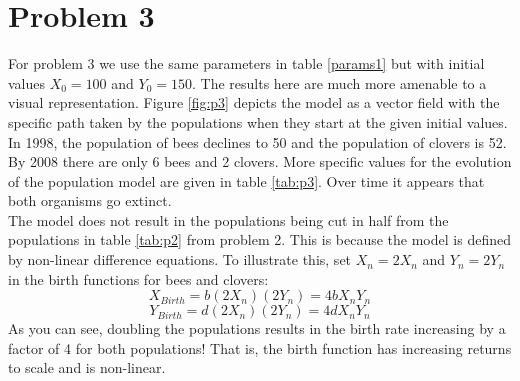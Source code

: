 \documentclass[12pt,a4paper,titlepage]{report}
\begin{document}
	\section*{Problem 3}
		For problem 3 we use the same parameters in table \ref{params1} but with initial values \(X_{0} = 100\) and \(Y_{0} = 150\). The results here are much more amenable to a visual representation. Figure \ref{fig:p3} depicts the model as a vector field with the specific path taken by the populations when they start at the given initial values.\\ 
		In 1998, the population of bees declines to 50 and the population of clovers is 52. By 2008 there are only 6 bees and 2 clovers. More specific values for the evolution of the population model are given in table \ref{tab:p3}. Over time it appears that both organisms go extinct. \\
		The model does not result in the populations being cut in half from the populations in table \ref{tab:p2} from problem 2. This is because the model is defined by non-linear difference equations. To illustrate this, set \(X_{n} = 2X_{n}\) and \(Y_{n} = 2Y_{n}\) in the birth functions for bees and clovers:
		\[X_{Birth} = b (2X_{n})(2Y_{n}) = 4bX_{n}Y_{n}\]
		\[Y_{Birth} = d (2X_{n})(2Y_{n}) = 4dX_{n}Y_{n}\]
		As you can see,  doubling the populations results in the birth rate increasing by a factor of 4 for both populations! That is, the birth function has increasing returns to scale and is non-linear. \\
		
\end{document}
